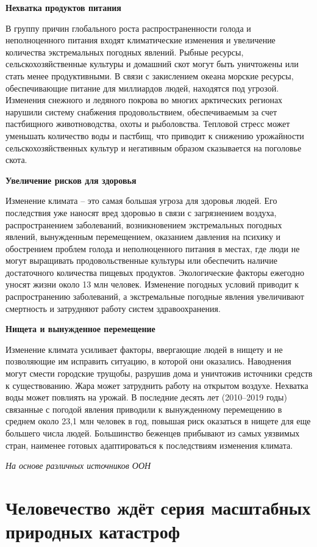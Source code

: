 \textbf{Нехватка продуктов питания}

В группу причин глобального роста распространенности голода и неполноценного питания входят климатические изменения и увеличение количества экстремальных погодных явлений. Рыбные ресурсы, сельскохозяйственные культуры и домашний скот могут быть уничтожены или стать менее продуктивными. В связи с закислением океана морские ресурсы, обеспечивающие питание для миллиардов людей, находятся под угрозой. Изменения снежного и ледяного покрова во многих арктических регионах нарушили систему снабжения продовольствием, обеспечиваемым за счет пастбищного животноводства, охоты и рыболовства. Тепловой стресс может уменьшать количество воды и пастбищ, что приводит к снижению урожайности сельскохозяйственных культур и негативным образом сказывается на поголовье скота.

\textbf{Увеличение рисков для здоровья}

Изменение климата – это самая большая угроза для здоровья людей. Его последствия уже наносят вред здоровью в связи с загрязнением воздуха, распространением заболеваний, возникновением экстремальных погодных явлений, вынужденным перемещением, оказанием давления на психику и обострением проблем голода и неполноценного питания в местах, где люди не могут выращивать продовольственные культуры или обеспечить наличие достаточного количества пищевых продуктов. Экологические факторы ежегодно уносят жизни около 13 млн человек. Изменение погодных условий приводит к распространению заболеваний, а экстремальные погодные явления увеличивают смертность и затрудняют работу систем здравоохранения.

\textbf{Нищета и вынужденное перемещение}

Изменение климата усиливает факторы, ввергающие людей в нищету и не позволяющие им исправить ситуацию, в которой они оказались. Наводнения могут смести городские трущобы, разрушив дома и уничтожив источники средств к существованию. Жара может затруднить работу на открытом воздухе. Нехватка воды может повлиять на урожай. В последние десять лет (2010–2019 годы) связанные с погодой явления приводили к вынужденному перемещению в среднем около 23,1 млн человек в год, повышая риск оказаться в нищете для еще большего числа людей. Большинство беженцев прибывают из самых уязвимых стран, наименее готовых адаптироваться к последствиям изменения климата.

\textit{На основе различных источников ООН}


\section{Человечество ждёт серия масштабных природных катастроф}

